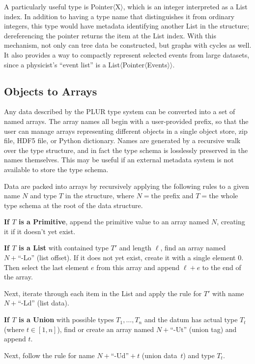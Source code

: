 \documentclass[10pt, conference, compsocconf]{IEEEtran}
\begin{document}
A particularly useful type is Pointer$\langle$X$\rangle$, which is an integer interpreted as a List index. In addition to having a type name that distinguishes it from ordinary integers, this type would have metadata identifying another List in the structure; dereferencing the pointer returns the item at the List index. With this mechanism, not only can tree data be constructed, but graphs with cycles as well. It also provides a way to compactly represent selected events from large datasets, since a physicist's ``event list'' is a List$\langle$Pointer$\langle$Events$\rangle\rangle$.

\subsection{Objects to Arrays}

Any data described by the PLUR type system can be converted into a set of named arrays. The array names all begin with a user-provided prefix, so that the user can manage arrays representing different objects in a single object store, zip file, HDF5 file, or Python dictionary. Names are generated by a recursive walk over the type structure, and in fact the type schema is losslessly preserved in the names themselves. This may be useful if an external metadata system is not available to store the type schema.

Data are packed into arrays by recursively applying the following rules to a given name $N$ and type $T$ in the structure, where $N = \mbox{the}$ prefix and $T = \mbox{the}$ whole type schema at the root of the data structure.

{\bf If $T$ is a Primitive}, append the primitive value to an array named $N$, creating it if it doesn't yet exist.

{\bf If $T$ is a List} with contained type $T'$ and length $\ell$, find an array named $N + \mbox{``-Lo''}$ (list offset). If it does not yet exist, create it with a single element $0$. Then select the last element $e$ from this array and append $\ell + e$ to the end of the array.

Next, iterate through each item in the List and apply the rule for $T'$ with name $N + \mbox{``-Ld''}$ (list data).

{\bf If $T$ is a Union} with possible types $T_1, \ldots, T_n$ and the datum has actual type $T_t$ (where $t \in [1, n]$), find or create an array named $N + \mbox{``-Ut''}$ (union tag) and append $t$.

Next, follow the rule for name $N + \mbox{``-Ud''} + t$ (union data~$t$) and type $T_t$.
\end{document}
